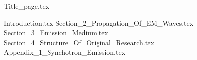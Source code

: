 \documentclass[a4paper,11pt]{article}
\numberwithin{equation}{section}
\numberwithin{figure}{section}
\begin{document}
\lfoot{}
{Title_page.tex}
\lfoot{}
\tableofcontents
\listoffigures
\newpage
\lfoot{}
{Introduction.tex}
\newpage
\lfoot{}
{Section_2_Propagation_Of_EM_Waves.tex}
\newpage
\lfoot{}
{Section_3_Emission_Medium.tex}
\newpage
\lfoot{}
{Section_4_Structure_Of_Original_Research.tex}
\newpage
\lfoot{}
\newpage
{Appendix_1_Synchotron_Emission.tex}
\lfoot{}
\end{document}
